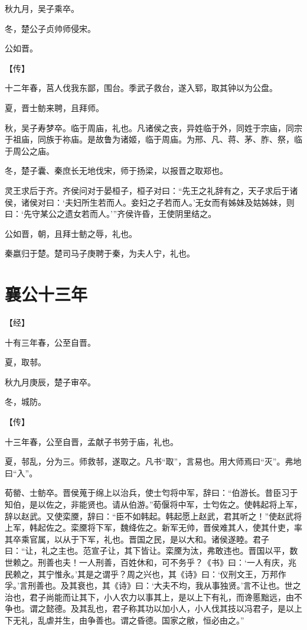 \documentclass[a4paper,12pt,UTF8,twoside]{ctexbook}
\begin{document}
秋九月，吴子乘卒。

冬，楚公子贞帅师侵宋。

公如晋。

【传】

十二年春，莒人伐我东鄙，围台。季武子救台，遂入郓，取其钟以为公盘。

夏，晋士鲂来聘，且拜师。

秋，吴子寿梦卒。临于周庙，礼也。凡诸侯之丧，异姓临于外，同姓于宗庙，同宗于祖庙，同族于祢庙。是故鲁为诸姬，临于周庙。为邢、凡、蒋、茅、胙、祭，临于周公之庙。

冬，楚子囊、秦庶长无地伐宋，师于扬梁，以报晋之取郑也。

灵王求后于齐。齐侯问对于晏桓子，桓子对曰：“先王之礼辞有之，天子求后于诸侯，诸侯对曰：‘夫妇所生若而人。妾妇之子若而人。’无女而有姊妹及姑姊妹，则曰：‘先守某公之遗女若而人。’”齐侯许昏，王使阴里结之。

公如晋，朝，且拜士鲂之辱，礼也。

秦嬴归于楚。楚司马子庚聘于秦，为夫人宁，礼也。

\chapter{襄公十三年}


【经】

十有三年春，公至自晋。

夏，取邿。

秋九月庚辰，楚子审卒。

冬，城防。

【传】

十三年春，公至自晋，孟献子书劳于庙，礼也。

夏，邿乱，分为三。师救邿，遂取之。凡书“取”，言易也。用大师焉曰“灭”。弗地曰“入”。

荀罃、士鲂卒。晋侯蒐于绵上以治兵，使士匄将中军，辞曰：“伯游长。昔臣习于知伯，是以佐之，非能贤也。请从伯游。”荀偃将中军，士匄佐之。使韩起将上军，辞以赵武。又使栾黡，辞曰：“臣不如韩起。韩起愿上赵武，君其听之！”使赵武将上军，韩起佐之。栾黡将下军，魏绛佐之。新军无帅，晋侯难其人，使其什吏，率其卒乘官属，以从于下军，礼也。晋国之民，是以大和。诸侯遂睦。君子曰：“让，礼之主也。范宣子让，其下皆让。栾黡为汰，弗敢违也。晋国以平，数世赖之。刑善也夫！一人刑善，百姓休和，可不务乎？《书》曰：‘一人有庆，兆民赖之，其宁惟永。’其是之谓乎？周之兴也，其《诗》曰：‘仪刑文王，万邦作孚。’言刑善也。及其衰也，其《诗》曰：‘大夫不均，我从事独贤。’言不让也。世之治也，君子尚能而让其下，小人农力以事其上，是以上下有礼，而谗慝黜远，由不争也。谓之懿德。及其乱也，君子称其功以加小人，小人伐其技以冯君子，是以上下无礼，乱虐并生，由争善也。谓之昏德。国家之敝，恒必由之。”
\end{document}
